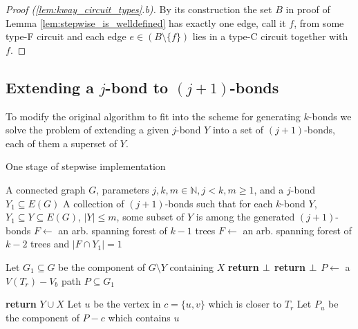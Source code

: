 \begin{proof}[Proof (\ref{lem:kway_circuit_types}.b)]
	By its construction the set $B$ in proof of Lemma \ref{lem:stepwise_is_welldefined} has exactly one edge, call it $f$, from some type-F circuit and each edge $e \in (B \setminus \{f\})$ lies in a type-C circuit together with $f$.
\end{proof}

\subsection*{Extending a $j$-bond to $(j+1)$-bonds}

To modify the original algorithm to fit into the scheme for generating $k$-bonds we solve the problem of extending a given $j$-bond $Y$ into a set of $(j+1)$-bonds, each of them a superset of $Y$.

\begin{algorithm}
	\caption{One stage of stepwise implementation}
	\label{alg:one-stage}
\begin{algorithmic}[1]
	\Require A connected graph $G$, parameters $j, k, m \in \mathbb{N}, j < k, m \geq 1$, and a $j$-bond $Y_1 \subseteq E(G)$
	\Ensure A collection of $(j+1)$-bonds such that for each $k$-bond $Y$, $Y_1 \subseteq Y \subseteq E(G)$, $\lvert Y \rvert \leq m$, some subset of $Y$ is among the generated $(j+1)$-bonds
	 
		\State $F \leftarrow$ an arb. spanning forest of $k-1$ trees
		\Else {}
		\State $F \leftarrow$ an arb. spanning forest of $k-2$ trees and ${\lvert F \cap Y_1 \rvert = 1}$
	\EndIf
		\State {}
	\EndFor

	\State Let $G_1 \subseteq G$ be the component of $G \setminus Y$ containing $X$
		\State \textbf{return $\perp$}
	\EndIf
		\State \textbf{return $\perp$}
	\EndIf
	\State $P \leftarrow$ a $V(T_r){-}V_b$ path $P \subseteq G_1$

		\State \textbf{return} $Y \cup X$ 
	\Else
			\State Let $u$ be the vertex in $c = \{u,v\}$ which is closer to $T_r$
			\State Let $P_u$ be the component of $P - c$ which contains $u$
			\State {}
		\EndFor
	\EndIf

	\EndProcedure
\end{algorithmic}
\end{algorithm}

